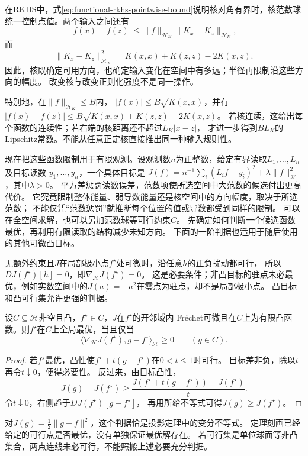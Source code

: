 在RKHS中，式\eqref{eq:functional-rkhs-pointwise-bound}说明核对角有界时，核范数球
统一控制点值。两个输入之间还有
\begin{equation}
  |f(x)-f(z)|
  \leq
  \lVert f\rVert_{\mathcal{H}_K}
  \lVert K_x-K_z\rVert_{\mathcal{H}_K},
  \label{eq:functional-rkhs-modulus-bound}
\end{equation}
而
\[
  \lVert K_x-K_z\rVert_{\mathcal{H}_K}^2
  =
  K(x,x)+K(z,z)-2K(x,z).
\]
因此，核既确定可用方向，也确定输入变化在空间中有多远；半径再限制沿这些方向的幅度。
改变核与改变正则化强度不是同一操作。

特别地，在$\lVert f\rVert_{\mathcal H_K}\leq B$内，
$|f(x)|\leq B\sqrt{K(x,x)}$，并有
$|f(x)-f(z)|\leq B\sqrt{K(x,x)+K(z,z)-2K(x,z)}$。
若核连续，这给出每个函数的连续性；若右端的核距离还不超过$L_K|x-z|$，
才进一步得到$BL_K$的Lipschitz常数。不能从任意正定核直接推出同一种输入规则性。

现在把这些函数限制用于有限观测。设观测数$n$为正整数，给定有界读取$L_1,\ldots,L_n$及目标读数
$y_1,\ldots,y_n$，一个具体目标是
$J(f)=n^{-1}\sum_i(L_if-y_i)^2+\lambda\lVert f\rVert_{\mathcal H}^2$，其中$\lambda>0$。
平方差惩罚读数误差，范数项使所选空间中大范数的候选付出更高代价。
它究竟限制整体能量、弱导数能量还是核空间中的方向幅度，取决于所选范数；
不能仅凭“范数惩罚”就推断每个位置的值或导数都受到同样的限制。
可以在全空间求解，也可以另加范数球等可行约束$C$。
先确定如何判断一个候选函数最优，再利用有限读取的结构减少未知方向。
下面的一阶判据也适用于随后使用的其他可微凸目标。

无额外约束且$J$在局部极小点$f^\star$处可微时，沿任意$h$的正负扰动都可行，
所以$DJ(f^\star)[h]=0$，即$\nabla_{\mathcal H}J(f^\star)=0$。
这是必要条件；非凸目标的驻点未必最优，例如实数空间中的$J(a)=-a^2$在零点为驻点，却不是局部极小点。
凸目标和凸可行集允许更强的判据。

\begin{theorem}[凸函数优化的一阶判据]
\label{thm:functional-convex-optimality}
设$C\subseteq\mathcal H$非空且凸，$f^\star\in C$，$J$在$f^\star$的开邻域内
Fréchet可微且在$C$上为有限凸函数。则$f^\star$在$C$上全局最优，当且仅当
\begin{equation}
 \langle\nabla_{\mathcal H}J(f^\star),g-f^\star\rangle_{\mathcal H}\geq0
 \qquad(g\in C).
 \label{eq:functional-convex-optimality}
\end{equation}
\end{theorem}
\begin{proof}
若$f^\star$最优，凸性使$f^\star+t(g-f^\star)$在$0<t\leq1$时可行。
目标差非负，除以$t$再令$t\downarrow0$，便得必要性。
反过来，由目标凸性，
\[
 J(g)-J(f^\star)\geq
 \frac{J(f^\star+t(g-f^\star))-J(f^\star)}{t}.
\]
令$t\downarrow0$，右侧趋于$DJ(f^\star)[g-f^\star]$，
再用所给不等式可得$J(g)\geq J(f^\star)$。
\end{proof}
对$J(g)=\frac12\lVert g-f\rVert^2$，这个判据恰是投影定理中的变分不等式。
定理刻画已经给定的可行点是否最优，没有单独保证最优解存在。
若可行集是单位球面等非凸集合，两点连线未必可行，不能照搬上述必要充分判据。

